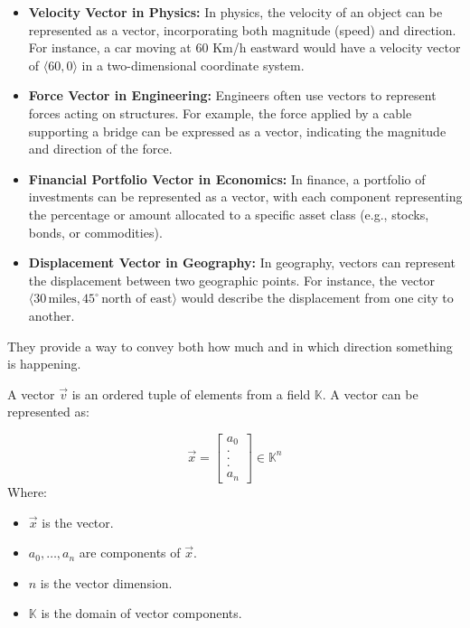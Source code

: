 \begin{itemize}

    \item \textbf{Velocity Vector in Physics:}
       In physics, the velocity of an object can be represented as a vector, incorporating both magnitude (speed) and direction. For instance, a car moving at 60 Km/h eastward would have a velocity vector of $\langle 60, 0 \rangle$ in a two-dimensional coordinate system.
    
    \item \textbf{Force Vector in Engineering:}
       Engineers often use vectors to represent forces acting on structures. For example, the force applied by a cable supporting a bridge can be expressed as a vector, indicating the magnitude and direction of the force.
    
    \item \textbf{Financial Portfolio Vector in Economics:}
       In finance, a portfolio of investments can be represented as a vector, with each component representing the percentage or amount allocated to a specific asset class (e.g., stocks, bonds, or commodities).
    
    \item \textbf{Displacement Vector in Geography:}
       In geography, vectors can represent the displacement between two geographic points. For instance, the vector $\langle 30 \, \text{miles}, 45^\circ \, \text{north of east} \rangle$ would describe the displacement from one city to another.
   
\end{itemize}


\noindent They provide a way to convey both how much and in which direction something is happening.
\\

\begin{tcolorbox}[colback=def_color,colframe=gray] \begin{definition}
A vector \(\vec{v}\) is an ordered tuple of elements from a field \(\mathbb{K}\). A vector can be represented as:

$$
\vec x = \begin{bmatrix}a_0 \\ . \\ . \\ . \\ a_n \end{bmatrix} \in \mathbb{K}^n
$$
\noindent
Where:
\begin{itemize}
    \item $\vec x$ is the vector.
    \item $a_0, \dots, a_n$ are components of $\vec x$.
    \item $n$ is the vector dimension.
    \item $\mathbb{K}$ is the domain of vector components.
\end{itemize}
\end{definition}
\end{tcolorbox}

